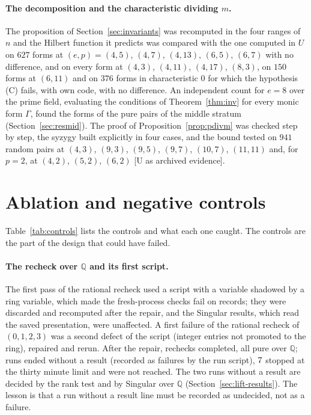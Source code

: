 \documentclass[11pt]{article}
\theoremstyle{definition}
\theoremstyle{remark}
\newcommand{\Q}{\mathbb{Q}}
\begin{document}
\paragraph{The decomposition and the characteristic dividing $m$.} The proposition of Section~\ref{sec:invariants} was recomputed in the four ranges of $n$ and the Hilbert function it predicts was compared with the one computed in $U$ on $627$ forms at $(e,p)=(4,5)$, $(4,7)$, $(4,13)$, $(6,5)$, $(6,7)$ with no difference, and on every form at $(4,3)$, $(4,11)$, $(4,17)$, $(8,3)$, on $150$ forms at $(6,11)$ and on $376$ forms in characteristic $0$ for which the hypothesis (C) fails, with own code, with no difference. An independent count for $e=8$ over the prime field, evaluating the conditions of Theorem~\ref{thm:inv} for every monic form $\Gamma$, found the forms of the pure pairs of the middle stratum (Section~\ref{sec:resmid}). The proof of Proposition~\ref{prop:pdivm} was checked step by step, the syzygy built explicitly in four cases, and the bound tested on $941$ random pairs at $(4,3)$, $(9,3)$, $(9,5)$, $(9,7)$, $(10,7)$, $(11,11)$ and, for $p=2$, at $(4,2)$, $(5,2)$, $(6,2)$ [U as archived evidence].

\FloatBarrier
\section{Ablation and negative controls}
\label{sec:ablation}

Table~\ref{tab:controls} lists the controls and what each one caught. The controls are the part of the design that could have failed.

\begin{table}[htbp]
\centering\footnotesize

\caption{Controls and negative controls of the computations: what each one tested and the outcome, read from the archived records; the controls that failed (two lifts to $\Q$, one script defect) identify the claims that are weaker than a first reading.}
\label{tab:controls}
\end{table}

\paragraph{The recheck over $\Q$ and its first script.} The first pass of the rational recheck used a script with a variable shadowed by a ring variable, which made the fresh-process checks fail on \ndiscarded{} records; they were discarded and recomputed after the repair, and the Singular results, which read the saved presentation, were unaffected. A first failure of the rational recheck of $(0,1,2,3)$ was a second defect of the script (integer entries not promoted to the ring), repaired and rerun. After the repair, \nqqOk{} rechecks completed, all pure over $\Q$; \nqqFailed{} runs ended without a result (recorded as failures by the run script), $7$ stopped at the thirty minute limit and \nqqNotRun{} were not reached. The two runs without a result are decided by the rank test and by Singular over $\Q$ (Section~\ref{sec:lift-results}). The lesson is that a run without a result line must be recorded as undecided, not as a failure.
\end{document}
